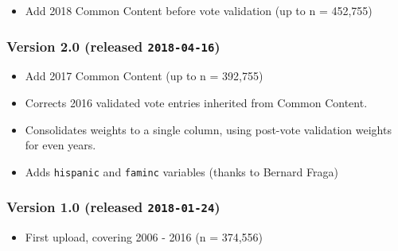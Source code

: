 \documentclass[10pt,article,oneside]{memoir}
\begin{document}
\begin{itemize}
\tightlist
\item
  Add 2018 Common Content before vote validation (up to n = 452,755)
\end{itemize}

\subsubsection{\texorpdfstring{Version 2.0 (released
\texttt{2018-04-16})}{Version 2.0 (released 2018-04-16)}}\label{version-2.0-released-2018-04-16}

\begin{itemize}
\tightlist
\item
  Add 2017 Common Content (up to n = 392,755)
\item
  Corrects 2016 validated vote entries inherited from Common Content.
\item
  Consolidates weights to a single column, using post-vote validation
  weights for even years.
\item
  Adds \texttt{hispanic} and \texttt{faminc} variables (thanks to
  Bernard Fraga)
\end{itemize}

\subsubsection{\texorpdfstring{Version 1.0 (released
\texttt{2018-01-24})}{Version 1.0 (released 2018-01-24)}}\label{version-1.0-released-2018-01-24}

\begin{itemize}
\tightlist
\item
  First upload, covering 2006 - 2016 (n = 374,556)
\end{itemize}
\end{document}

